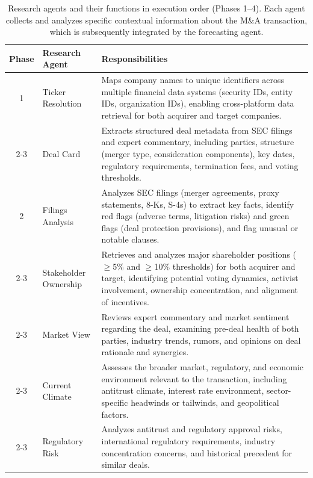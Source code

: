 \documentclass{article}
\theoremstyle{plain}
\theoremstyle{definition}
\theoremstyle{remark}
\begin{document}
\begin{table}[t]
  \caption{Research agents and their functions in execution order (Phases 1--4). Each agent collects and analyzes specific contextual information about the M\&A transaction, which is subsequently integrated by the forecasting agent.}
  \label{tab:research-agents}
  \centering
  \scriptsize
  \begin{tabularx}{\textwidth}{@{}c l X@{}}
    \toprule
    \textbf{Phase} & \textbf{Research Agent} & \textbf{Responsibilities} \\
    \midrule
    1 & Ticker Resolution & Maps company names to unique identifiers across multiple financial data systems (security IDs, entity IDs, organization IDs), enabling cross-platform data retrieval for both acquirer and target companies. \\
    \cmidrule(lr){2-3}
     & Deal Card & Extracts structured deal metadata from SEC filings and expert commentary, including parties, structure (merger type, consideration components), key dates, regulatory requirements, termination fees, and voting thresholds.  \\
    \midrule
    2 & Filings Analysis & Analyzes SEC filings (merger agreements, proxy statements, 8-Ks, S-4s) to extract key facts, identify red flags (adverse terms, litigation risks) and green flags (deal protection provisions), and flag unusual or notable clauses. \\
    \cmidrule(lr){2-3}
     & Stakeholder Ownership & Retrieves and analyzes major shareholder positions ($\geq$5\% and $\geq$10\% thresholds) for both acquirer and target, identifying potential voting dynamics, activist involvement, ownership concentration, and alignment of incentives. \\
    \cmidrule(lr){2-3}
     & Market View & Reviews expert commentary and market sentiment regarding the deal, examining pre-deal health of both parties, industry trends, rumors, and opinions on deal rationale and synergies. \\
    \cmidrule(lr){2-3}
     & Current Climate & Assesses the broader market, regulatory, and economic environment relevant to the transaction, including antitrust climate, interest rate environment, sector-specific headwinds or tailwinds, and geopolitical factors. \\
    \cmidrule(lr){2-3}
     & Regulatory Risk & Analyzes antitrust and regulatory approval risks, international regulatory requirements, industry concentration concerns, and historical precedent for similar deals. \\

\end{tabularx}
\end{table}
\end{document}
